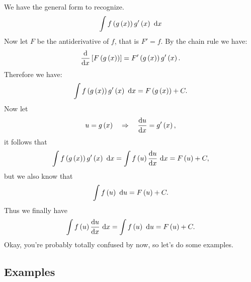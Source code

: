 \documentclass[12pt,addpoints, answers, fleqn]{exam}
\begin{document}
We have the general form to recognize.
\[
\int f \left( g \left( x \right) \right)g' \left( x \right) \ {\rm{d}}x
\]
Now let $F$ be the antiderivative of $f$, that is $F'=f$. By the chain rule we have:
\[
\frac{{\rm{d}}}{{\rm{d}}x} \left[ F \left( g \left( x \right)\right)\right] = F' \left( g \left( x \right)\right)g' \left( x \right).
\]
Therefore we have:
\[
\int f \left( g \left( x \right) \right)g' \left( x \right) \ {\rm{d}}x = F \left( g \left( x \right)\right) + C.
\]
Now let
\[
u = g \left( x \right) \quad \Rightarrow \quad 
\frac{{\rm{d}}u}{{\rm{d}}x} =  g' \left( x \right),
\]
it follows that
\[
\int f \left( g \left( x \right) \right)g' \left( x \right) \ {\rm{d}}x =
\int f \left( u \right) \frac{{\rm{d}}u}{{\rm{d}}x} \ {\rm{d}}x
= F \left( u \right) + C,
\]
but we also know that
\[
\int f \left( u \right) \ {\rm{d}}u = F \left( u \right) + C.
\]
Thus we finally have
\[
\int f \left( u \right) \frac{{\rm{d}}u}{{\rm{d}}x} \ {\rm{d}}x=\int f \left( u \right) \ {\rm{d}}u = F \left( u \right) + C.
\]
Okay, you're probably totally confused by now, so let's do some examples.

\subsection{Examples}
\end{document}
